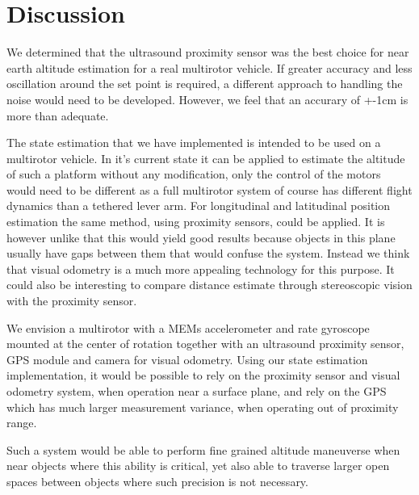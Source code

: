 \section{Discussion}\label{sec:discussion}
We determined that the ultrasound proximity sensor was the best choice for near earth altitude estimation for a real multirotor 
vehicle. If greater accuracy and less oscillation around the set point is required, a different approach to handling the noise would
need to be developed. However, we feel that an accurary of +-1cm is more than adequate.

The state estimation that we have implemented is intended to be used on a multirotor vehicle. In it's current state it can be applied
to estimate the altitude of such a platform without any modification, only the control of the motors would need to be different as 
a full multirotor system 
of course has different flight dynamics than a tethered lever arm. For longitudinal and latitudinal position estimation the same method,
using proximity sensors, could be applied. It is however unlike that this would yield good results because objects in this plane usually
have gaps between them that would confuse the system. Instead we think that visual odometry\cite{Nister2004} is a much more
appealing technology for this
purpose. It could also be interesting to compare distance estimate through stereoscopic vision with the proximity sensor.

We envision a multirotor with a MEMs accelerometer and rate gyroscope
mounted at the center of rotation together with an ultrasound proximity sensor, GPS module and camera for visual odometry.
Using our state estimation implementation,
it would be possible to rely on the proximity sensor and visual odometry system, when operation near a surface plane, and rely
on the GPS which has much larger 
measurement variance, when operating out of proximity range.

Such a system would be able to perform fine grained altitude maneuverse when near objects where this ability is critical, yet also able
to traverse larger open spaces between objects where such precision is not necessary.
